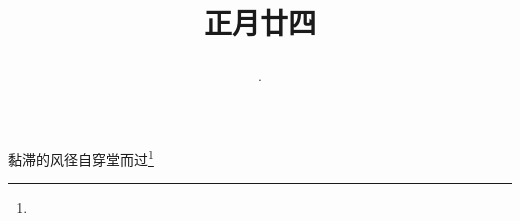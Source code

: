 \title{\date[d=4,m=3,y=2024][year:cn-y,年,month:cn,day:cn,日,·,weekday]·正月廿四 }
黏滞的风径自穿堂而过\footnote{ }

